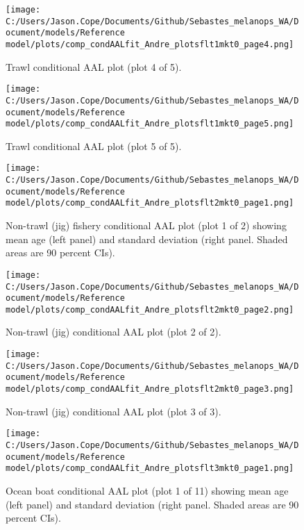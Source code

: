 \documentclass[11pt,
  english,
  letterpaper,
]{article}
\begin{document}
\begin{figure}
\centering
\texttt{[image: C:/Users/Jason.Cope/Documents/Github/Sebastes\_melanops\_WA/Document/models/Reference model/plots/comp\_condAALfit\_Andre\_plotsflt1mkt0\_page4.png]}
\caption{Trawl conditional AAL plot (plot 4 of 5).\label{fig:comp_condAALfit_Andre_plotsflt1mkt0_page4}}
\end{figure}

\begin{figure}
\centering
\texttt{[image: C:/Users/Jason.Cope/Documents/Github/Sebastes\_melanops\_WA/Document/models/Reference model/plots/comp\_condAALfit\_Andre\_plotsflt1mkt0\_page5.png]}
\caption{Trawl conditional AAL plot (plot 5 of 5).\label{fig:comp_condAALfit_Andre_plotsflt1mkt0_page5}}
\end{figure}

\begin{figure}
\centering
\texttt{[image: C:/Users/Jason.Cope/Documents/Github/Sebastes\_melanops\_WA/Document/models/Reference model/plots/comp\_condAALfit\_Andre\_plotsflt2mkt0\_page1.png]}
\caption{Non-trawl (jig) fishery conditional AAL plot (plot 1 of 2) showing mean age (left panel) and standard deviation (right panel. Shaded areas are 90 percent CIs).\label{fig:comp_condAALfit_Andre_plotsflt2mkt0_page1}}
\end{figure}

\begin{figure}
\centering
\texttt{[image: C:/Users/Jason.Cope/Documents/Github/Sebastes\_melanops\_WA/Document/models/Reference model/plots/comp\_condAALfit\_Andre\_plotsflt2mkt0\_page2.png]}
\caption{Non-trawl (jig) conditional AAL plot (plot 2 of 2).\label{fig:comp_condAALfit_Andre_plotsflt2mkt0_page2}}
\end{figure}

\begin{figure}
\centering
\texttt{[image: C:/Users/Jason.Cope/Documents/Github/Sebastes\_melanops\_WA/Document/models/Reference model/plots/comp\_condAALfit\_Andre\_plotsflt2mkt0\_page3.png]}
\caption{Non-trawl (jig) conditional AAL plot (plot 3 of 3).\label{fig:comp_condAALfit_Andre_plotsflt2mkt0_page3}}
\end{figure}

\begin{figure}
\centering
\texttt{[image: C:/Users/Jason.Cope/Documents/Github/Sebastes\_melanops\_WA/Document/models/Reference model/plots/comp\_condAALfit\_Andre\_plotsflt3mkt0\_page1.png]}
\caption{Ocean boat conditional AAL plot (plot 1 of 11) showing mean age (left panel) and standard deviation (right panel. Shaded areas are 90 percent CIs).\label{fig:comp_condAALfit_Andre_plotsflt3mkt0_page1}}
\end{figure}
\end{document}
